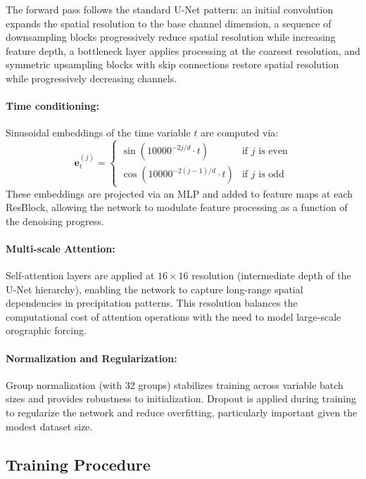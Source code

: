 \documentclass[11pt]{article}
\begin{document}
The forward pass follows the standard U-Net pattern: an initial convolution expands the spatial resolution to the base channel dimension, a sequence of downsampling blocks progressively reduce spatial resolution while increasing feature depth, a bottleneck layer applies processing at the coarsest resolution, and symmetric upsampling blocks with skip connections restore spatial resolution while progressively decreasing channels.

\paragraph{Time conditioning:} Sinusoidal embeddings of the time variable $t$ are computed via:
\begin{equation}
\mathbf{e}_t^{(j)} =
  \begin{cases}
    \sin(10000^{-2j/d} \cdot t)    & \mbox{if } j \mbox{ is even} \\
    \cos(10000^{-2(j-1)/d} \cdot t) & \mbox{if } j \mbox{ is odd}
  \end{cases}
\end{equation}
These embeddings are projected via an MLP and added to feature maps at each ResBlock, allowing the network to modulate feature processing as a function of the denoising progress.

\paragraph{Multi-scale Attention:} Self-attention layers are applied at $16\times16$ resolution (intermediate depth of the U-Net hierarchy), enabling the network to capture long-range spatial dependencies in precipitation patterns. This resolution balances the computational cost of attention operations with the need to model large-scale orographic forcing.

\paragraph{Normalization and Regularization:} Group normalization (with 32 groups) stabilizes training across variable batch sizes and provides robustness to initialization. Dropout is applied during training to regularize the network and reduce overfitting, particularly important given the modest dataset size.

\subsection{Training Procedure}
    
\end{document}
